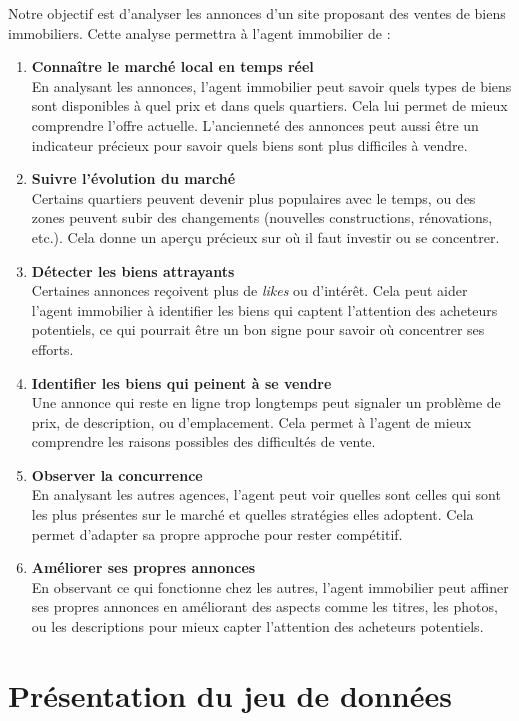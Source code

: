 \documentclass[a4paper, 12pt, twoside]{report}
\begin{document}
	Notre objectif est d'analyser les annonces d'un site proposant des ventes de biens immobiliers. Cette analyse permettra à l'agent immobilier de :
	\begin{enumerate}
		\item {\bf Connaître le marché local en temps réel} \\
		En analysant les annonces, l'agent immobilier peut savoir quels types de biens sont disponibles à quel prix et dans quels quartiers. Cela lui permet de mieux comprendre l'offre actuelle. L'ancienneté des annonces peut aussi être un indicateur précieux pour savoir quels biens sont plus difficiles à vendre.
		\item {\bf Suivre l'évolution du marché} \\
		Certains quartiers peuvent devenir plus populaires avec le temps, ou des zones peuvent subir des changements (nouvelles constructions, rénovations, etc.). Cela donne un aperçu précieux sur où il faut investir ou se concentrer.
		\item {\bf Détecter les biens attrayants} \\
		Certaines annonces reçoivent plus de {\it likes} ou d'intérêt. Cela peut aider l'agent immobilier à identifier les biens qui captent l'attention des acheteurs potentiels, ce qui pourrait être un bon signe pour savoir où concentrer ses efforts.
		\item {\bf Identifier les biens qui peinent à se vendre} \\
		Une annonce qui reste en ligne trop longtemps peut signaler un problème de prix, de description, ou d'emplacement. Cela permet à l'agent de mieux comprendre les raisons possibles des difficultés de vente.
		\item {\bf Observer la concurrence} \\
		En analysant les autres agences, l'agent peut voir quelles sont celles qui sont les plus présentes sur le marché et quelles stratégies elles adoptent. Cela permet d'adapter sa propre approche pour rester compétitif.
		\item {\bf Améliorer ses propres annonces} \\
		En observant ce qui fonctionne chez les autres, l'agent immobilier peut affiner ses propres annonces en améliorant des aspects comme les titres, les photos, ou les descriptions pour mieux capter l'attention des acheteurs potentiels. \\
	\end{enumerate}

	\section{Présentation du jeu de données}
\end{document}
